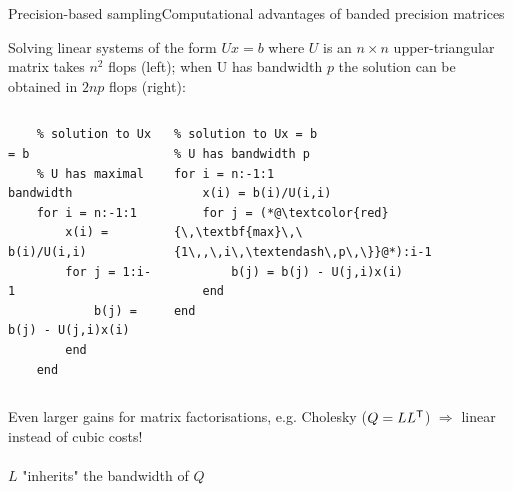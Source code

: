 \documentclass[xcolor=svgnames, 10pt, aspectratio=169]{beamer}
\newcommand\transpose[1]{{#1}^{\sf{T}}}
\begin{document}
\begin{frame}[fragile]{Precision-based sampling}{Computational advantages of banded precision matrices}

    Solving linear systems of the form $Ux = b$ where $U$ is an $n \times n$ upper-triangular matrix takes $n^2$ flops (left); when U has bandwidth $p$ the solution can be obtained in $2 n p$ flops (right):

    \begin{columns}
        \begin{lstlisting}
    % solution to Ux = b
    % U has maximal bandwidth
    for i = n:-1:1
        x(i) = b(i)/U(i,i)
        for j = 1:i-1
            b(j) = b(j) - U(j,i)x(i)
        end
    end
        \end{lstlisting}
        \begin{lstlisting}
% solution to Ux = b
% U has bandwidth p            
for i = n:-1:1
    x(i) = b(i)/U(i,i)
    for j = (*@\textcolor{red}{\,\textbf{max}\,\{1\,,\,i\,\textendash\,p\,\}}@*):i-1
        b(j) = b(j) - U(j,i)x(i)
    end
end
        \end{lstlisting}
    \end{columns}
    \vspace{0.3cm}

    Even larger gains for matrix factorisations, e.g. Cholesky ($Q = L\transpose{L}$) $\Longrightarrow$ linear instead of cubic costs! \\~\\

    $L$ "inherits" the bandwidth of $Q$ \citep[][Theorem 4.3.1]{golubvanloan2013}
\end{frame}
\end{document}
